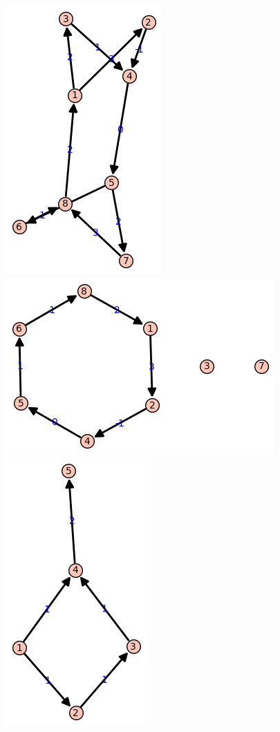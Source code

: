 \documentclass[11pt, oneside]{article}
\begin{document}
\begin{enumerate}
\begin{center}
      \includegraphics[scale=.5]{Figures/09_3.png}
      \includegraphics[scale=.5]{Figures/09_4.png} \\
      \includegraphics[scale=.5]{Figures/09_5.png}
    \end{center}


\end{enumerate}
\end{document}
